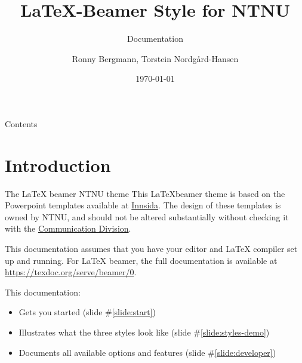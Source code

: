\documentclass[aspectratio=169]{beamer}
\title{\LaTeX{}-Beamer Style for NTNU}
\subtitle{Documentation}
\author{Ronny Bergmann, Torstein Nordgård-Hansen}
\date{\today}
\begin{document}
	\maketitle
	\begin{frame}{Contents}
		\tableofcontents
	\end{frame}


	\section{Introduction}
		\begin{frame}{The \LaTeX{} beamer NTNU theme}
			This \LaTeX beamer theme is based on the Powerpoint templates available at \href{https://innsida.ntnu.no/wiki/-/wiki/English/Create+NTNU+presentations\#section-Create+NTNU+presentations-Powerpoint+templates}{Innsida}.
			The design of these templates is owned by NTNU, and should not be altered
	substantially without checking it with the \href{https://www.ntnu.no/adm/komm}{Communication Division}.

			This documentation assumes that you have your editor and \LaTeX{} compiler set up and running. For \LaTeX{} beamer, the full documentation is available at \url{https://texdoc.org/serve/beamer/0}.

			This documentation:
			\begin{itemize}
				\item Gets you started (slide \#\ref{slide:start})
				\item Illustrates what the three styles look like (slide \#\ref{slide:styles-demo})
				\item Documents all available options and features (slide \#\ref{slide:developer})
			\end{itemize}
		\end{frame}
\end{document}
